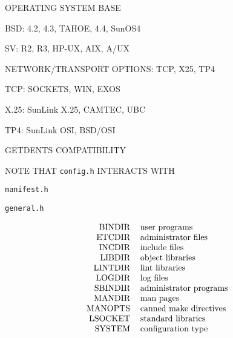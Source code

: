 \begin{bwslide}

\begin{nrtc}
\item	OPERATING SYSTEM BASE
    \begin{nrtc}
    \item	BSD: 4.2, 4.3, TAHOE, 4.4, SunOS4

    \item	SV: R2, R3, HP-UX, AIX, A/UX
    \end{nrtc}

\item	NETWORK/TRANSPORT OPTIONS: TCP, X25, TP4
    \begin{nrtc}
    \item	TCP: SOCKETS, WIN, EXOS

    \item	X.25: SunLink X.25, CAMTEC, UBC

    \item	TP4: SunLink OSI, BSD/OSI
    \end{nrtc}
\end{nrtc}
\end{bwslide}


\begin{bwslide}

\begin{nrtc}
\item	GETDENTS COMPATIBILITY

\item	NOTE THAT \verb"config.h" INTERACTS WITH
    \begin{nrtc}
    \item	\verb"manifest.h"

    \item	\verb"general.h"
    \end{nrtc}
\end{nrtc}
\end{bwslide}


\begin{bwslide}

\[\begin{tabular}{rl}
BINDIR&		user programs\\
ETCDIR&		administrator files\\
INCDIR&		include files\\
LIBDIR&		object libraries\\
LINTDIR&	 lint libraries\\
LOGDIR&		log files\\
SBINDIR&	 administrator programs\\
MANDIR&		man pages\\
MANOPTS&	canned make directives\\
LSOCKET&	standard libraries\\
SYSTEM&		configuration type
\end{tabular}\]
\end{bwslide}


